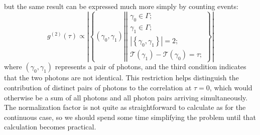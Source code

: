 \documentclass{article}
\newcommand{\braces}[1]{\ensuremath{\left\lbrace #1 \right\rbrace}}
\newcommand{\setbuilder}[2]{\ensuremath{\braces{#1 \left| #2 \right.}}}
\newcommand{\gn}[1]{\ensuremath{g^{(#1)}}}
\newcommand{\abs}[1]{\ensuremath{\left|#1\right|}}
\newcommand{\Time}{\ensuremath{\mathcal{T}}}
\newcommand{\photon}{\ensuremath{\gamma}}
\newcommand{\photons}{\ensuremath{\Gamma}}
\begin{document}
but the same result can be expressed much more simply by counting events:
\begin{equation}
\label{eq:photon_correlation_prop}
\gn{2}(\tau) \propto \abs{\setbuilder
                                  {(\photon_{0},\photon_{1})}
                                  {\left|\begin{aligned}
                                        \photon_{0}\in\photons;\\
                                        \photon_{1}\in\photons;\\
                                        \abs{\braces{\photon_{0},\photon_{1}}}=2;\\
                                        \Time(\photon_{1})-\Time(\photon_{0})=\tau;
                                  \end{aligned}\right.}}
\end{equation}
where $(\photon_{0},\photon_{1})$ represents a pair of photons, and the third condition indicates that the two photons are not identical. This restriction helps distinguish the contribution of distinct pairs of photons to the correlation at $\tau=0$, which would otherwise be a sum of all photons and all photon pairs arriving simultaneously. The normalization factor is not quite as straightforward to calculate as for the continuous case, so we should spend some time simplifying the problem until that calculation becomes practical.
\end{document}
